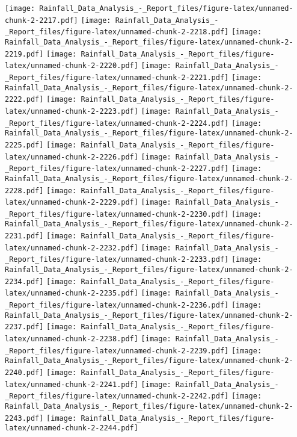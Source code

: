 \documentclass[
]{article}
\begin{document}
\texttt{[image: Rainfall\_Data\_Analysis\_-\_Report\_files/figure-latex/unnamed-chunk-2-2217.pdf]}
\texttt{[image: Rainfall\_Data\_Analysis\_-\_Report\_files/figure-latex/unnamed-chunk-2-2218.pdf]}
\texttt{[image: Rainfall\_Data\_Analysis\_-\_Report\_files/figure-latex/unnamed-chunk-2-2219.pdf]}
\texttt{[image: Rainfall\_Data\_Analysis\_-\_Report\_files/figure-latex/unnamed-chunk-2-2220.pdf]}
\texttt{[image: Rainfall\_Data\_Analysis\_-\_Report\_files/figure-latex/unnamed-chunk-2-2221.pdf]}
\texttt{[image: Rainfall\_Data\_Analysis\_-\_Report\_files/figure-latex/unnamed-chunk-2-2222.pdf]}
\texttt{[image: Rainfall\_Data\_Analysis\_-\_Report\_files/figure-latex/unnamed-chunk-2-2223.pdf]}
\texttt{[image: Rainfall\_Data\_Analysis\_-\_Report\_files/figure-latex/unnamed-chunk-2-2224.pdf]}
\texttt{[image: Rainfall\_Data\_Analysis\_-\_Report\_files/figure-latex/unnamed-chunk-2-2225.pdf]}
\texttt{[image: Rainfall\_Data\_Analysis\_-\_Report\_files/figure-latex/unnamed-chunk-2-2226.pdf]}
\texttt{[image: Rainfall\_Data\_Analysis\_-\_Report\_files/figure-latex/unnamed-chunk-2-2227.pdf]}
\texttt{[image: Rainfall\_Data\_Analysis\_-\_Report\_files/figure-latex/unnamed-chunk-2-2228.pdf]}
\texttt{[image: Rainfall\_Data\_Analysis\_-\_Report\_files/figure-latex/unnamed-chunk-2-2229.pdf]}
\texttt{[image: Rainfall\_Data\_Analysis\_-\_Report\_files/figure-latex/unnamed-chunk-2-2230.pdf]}
\texttt{[image: Rainfall\_Data\_Analysis\_-\_Report\_files/figure-latex/unnamed-chunk-2-2231.pdf]}
\texttt{[image: Rainfall\_Data\_Analysis\_-\_Report\_files/figure-latex/unnamed-chunk-2-2232.pdf]}
\texttt{[image: Rainfall\_Data\_Analysis\_-\_Report\_files/figure-latex/unnamed-chunk-2-2233.pdf]}
\texttt{[image: Rainfall\_Data\_Analysis\_-\_Report\_files/figure-latex/unnamed-chunk-2-2234.pdf]}
\texttt{[image: Rainfall\_Data\_Analysis\_-\_Report\_files/figure-latex/unnamed-chunk-2-2235.pdf]}
\texttt{[image: Rainfall\_Data\_Analysis\_-\_Report\_files/figure-latex/unnamed-chunk-2-2236.pdf]}
\texttt{[image: Rainfall\_Data\_Analysis\_-\_Report\_files/figure-latex/unnamed-chunk-2-2237.pdf]}
\texttt{[image: Rainfall\_Data\_Analysis\_-\_Report\_files/figure-latex/unnamed-chunk-2-2238.pdf]}
\texttt{[image: Rainfall\_Data\_Analysis\_-\_Report\_files/figure-latex/unnamed-chunk-2-2239.pdf]}
\texttt{[image: Rainfall\_Data\_Analysis\_-\_Report\_files/figure-latex/unnamed-chunk-2-2240.pdf]}
\texttt{[image: Rainfall\_Data\_Analysis\_-\_Report\_files/figure-latex/unnamed-chunk-2-2241.pdf]}
\texttt{[image: Rainfall\_Data\_Analysis\_-\_Report\_files/figure-latex/unnamed-chunk-2-2242.pdf]}
\texttt{[image: Rainfall\_Data\_Analysis\_-\_Report\_files/figure-latex/unnamed-chunk-2-2243.pdf]}
\texttt{[image: Rainfall\_Data\_Analysis\_-\_Report\_files/figure-latex/unnamed-chunk-2-2244.pdf]}
\end{document}
